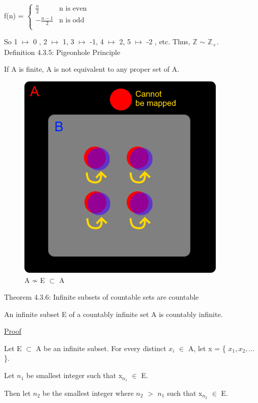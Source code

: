 	\hspace{0.5cm} f(n) = 
	$
	\begin{cases}
		\frac{n}{2} & \text{n is even} \\
		-\frac{n-1}{2} & \text{n is odd} \\
	\end{cases}
	$

	So 1 $\mapsto$ 0 , 2 $\mapsto$ 1, 3 $\mapsto$ -1, 4 $\mapsto$ 2, 5 $\mapsto$ -2 , etc.
	Thus, $\mathbb{Z}$ $\sim$ $\mathbb{Z}_+$. \\ 

{ \color{blue} Definition 4.3.5: Pigeonhole Principle } 

	\qquad If A is finite, A is not equivalent to any proper set of A.

	\begin{figure}[h]
	\centering
	\includegraphics[scale=0.5]{Images/4.3.5.png}
	\caption{A $\not \sim$ E $\subset$ A}
\end{figure}

{ \color{red} Theorem 4.3.6: Infinite subsets of countable sets are countable } 

	\qquad An infinite subset E of a countably infinite set A is countably infinite.

{ \color{magenta} \underline{Proof} } 

	Let E $\subset$ A be an infinite subset.
	For every distinct $x_i$ $\in$ A, let x = \{ $x_1, x_2, ...$ \}.

	Let $n_1$ be smallest integer such that x$_{n_1}$ $\in$ E.

	Then let $n_2$ be the smallest integer where $n_2$ $>$ $n_1$ such that x$_{n_2}$ $\in$ E.

